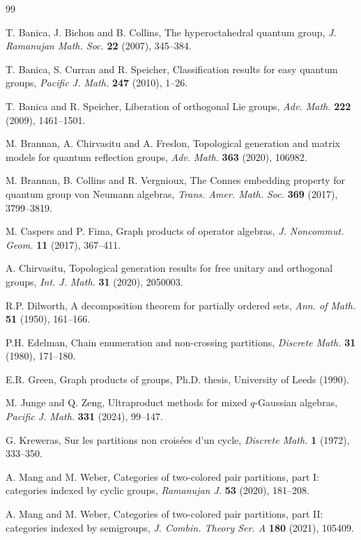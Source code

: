 \documentclass[11pt,a4paper]{article}
\begin{document}
\begin{thebibliography}{99}

 T. Banica, J. Bichon and B. Collins, The hyperoctahedral quantum group, \emph{J. Ramanujan Math. Soc.} \textbf{22} (2007), 345--384.

 T. Banica, S. Curran and R. Speicher, Classification results for easy quantum groups, \emph{Pacific J. Math.} \textbf{247} (2010), 1--26.

 T. Banica and R. Speicher, Liberation of orthogonal Lie groups, \emph{Adv. Math.} \textbf{222} (2009), 1461--1501.

 M. Brannan, A. Chirvasitu and A. Freslon, Topological generation and matrix models for quantum reflection groups, \emph{Adv. Math.} \textbf{363} (2020), 106982.

 M. Brannan, B. Collins and R. Vergnioux, The Connes embedding property for quantum group von Neumann algebras, \emph{Trans. Amer. Math. Soc.} \textbf{369} (2017), 3799--3819.

 M. Caspers and P. Fima, Graph products of operator algebras, \emph{J. Noncommut. Geom.} \textbf{11} (2017), 367--411.

 A. Chirvasitu, Topological generation results for free unitary and orthogonal groups, \emph{Int. J. Math.} \textbf{31} (2020), 2050003.

 R.P. Dilworth, A decomposition theorem for partially ordered sets, \emph{Ann. of Math.} \textbf{51} (1950), 161--166.

 P.H. Edelman, Chain enumeration and non-crossing partitions, \emph{Discrete Math.} \textbf{31} (1980), 171--180.

 E.R. Green, Graph products of groups, Ph.D. thesis, University of Leeds (1990).

 M. Junge and Q. Zeng, Ultraproduct methods for mixed $q$-Gaussian algebras, \emph{Pacific J. Math.} \textbf{331} (2024), 99--147.

 G. Kreweras, Sur les partitions non crois\'ees d'un cycle, \emph{Discrete Math.} \textbf{1} (1972), 333--350.

 A. Mang and M. Weber, Categories of two-colored pair partitions, part I: categories indexed by cyclic groups, \emph{Ramanujan J.} \textbf{53} (2020), 181--208.

 A. Mang and M. Weber, Categories of two-colored pair partitions, part II: categories indexed by semigroups, \emph{J. Combin. Theory Ser. A} \textbf{180} (2021), 105409.


\end{thebibliography}
\end{document}
